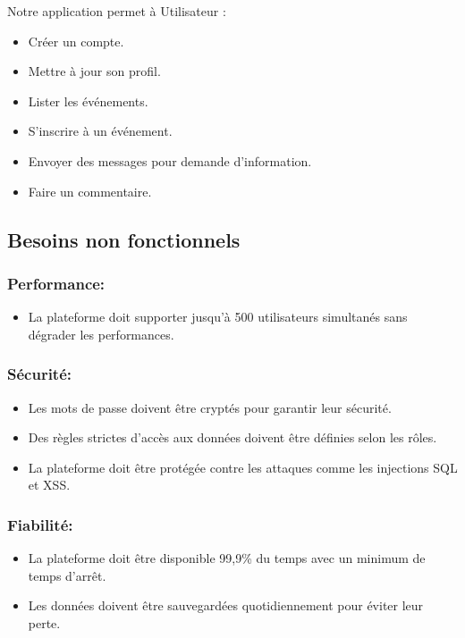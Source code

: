 Notre application permet à Utilisateur :
\begin{itemize}
    \item Créer un compte.
    \item Mettre à jour son profil.
    \item Lister les événements.
    \item S’inscrire à un événement.
    \item Envoyer des messages pour demande d'information.
    \item Faire un commentaire.
\end{itemize}

\subsection{Besoins non fonctionnels}

\subsubsection*{Performance:}
\begin{itemize}
    \item La plateforme doit supporter jusqu’à 500 utilisateurs simultanés sans dégrader les performances.
\end{itemize}

\subsubsection*{Sécurité:}
\begin{itemize}
    \item Les mots de passe doivent être cryptés pour garantir leur sécurité.
    \item Des règles strictes d’accès aux données doivent être définies selon les rôles.
    \item La plateforme doit être protégée contre les attaques comme les injections SQL et XSS.
\end{itemize}

\subsubsection*{Fiabilité:}
\begin{itemize}
    \item La plateforme doit être disponible 99,9\% du temps avec un minimum de temps d’arrêt.
    \item Les données doivent être sauvegardées quotidiennement pour éviter leur perte.
\end{itemize}

